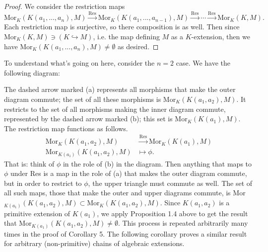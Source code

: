 \begin{proof}
We consider the restriction maps
\[\text{Mor}_K(K(a_1, ..., a_n), M) \stackrel{\text{Res}}{\rightarrow} \text{Mor}_K(K(a_1, ..., a_{n-1}), M) \stackrel{\text{Res}}{\rightarrow} \cdots \stackrel{\text{Res}}{\rightarrow} \text{Mor}_K(K, M).\]
Each restriction map is surjective, so there composition is as well. Then since Mor$_K(K, M) \ni (K \hookrightarrow M)$, i.e. the map defining $M$ as a $K$-extension, then we have $\text{Mor}_K(K(a_1, ..., a_n), M) \neq \emptyset$ as desired.
\end{proof}

\begin{rmk}
To understand what's going on here, consider the $n=2$ case. We have the following diagram:
\begin{center}
\end{center}
The dashed arrow marked (a) represents all morphisms that make the outer diagram commute; the set of all these morphisms is Mor$_K(K(a_1, a_2), M)$. It restricts to the set of all morphisms making the inner diagram commute, represented by the dashed arrow marked (b); this set is Mor$_K(K(a_1), M)$. The restriction map functions as follows.
\begin{align*}
\text{Mor}_K(K(a_1, a_2), M) &\stackrel{\text{Res}}{\rightarrow} \text{Mor}_K(K(a_1), M) \\
\text{Mor}_{K(a_1)}(K(a_1, a_2), M) &\mapsto \phi.
\end{align*}
That is: think of $\phi$ in the role of (b) in the diagram. Then anything that maps to $\phi$ under Res is a map in the role of (a) that makes the outer diagram commute, but in order to restrict to $\phi$, the upper triangle must commute as well. The set of all such maps, those that make the outer and upper diagrams commute, is Mor$_{K(a_1)}(K(a_1, a_2), M) \subset \text{Mor}_K(K(a_1, a_2), M)$. Since $K(a_1, a_2)$ is a primitive extension of $K(a_1)$, we apply Proposition 1.4 above to get the result that Mor$_{K(a_1)}(K(a_1, a_2), M) \neq \emptyset$. This process is repeated arbitrarily many times in the proof of Corollary 5. The following corollary proves a similar result for arbitrary (non-primitive) chains of algebraic extensions.
\end{rmk}

